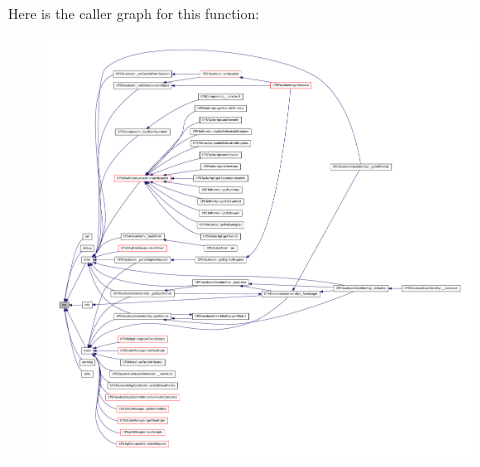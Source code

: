 Here is the caller graph for this function:\nopagebreak
\begin{figure}[H]
\begin{center}
\leavevmode
\includegraphics[width=400pt]{classCPSLog_a4c3be4120dc6dee2c97a6dde9428ac76_icgraph}
\end{center}
\end{figure}


